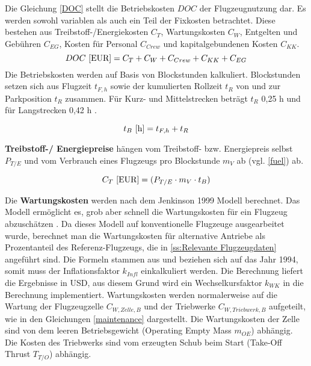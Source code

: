 Die Gleichung \eqref{DOC} stellt die Betriebskosten $DOC$ der Flugzeugnutzung dar. 
Es werden sowohl variablen als auch ein Teil der Fixkosten betrachtet.
Diese bestehen aus Treibstoff-/Energiekosten $C_T$, 
Wartungskosten $C_W$, Entgelten und Gebühren $C_{EG}$, 
Kosten für Personal $C_{Crew}$ und kapitalgebundenen Kosten $C_{KK}$.
%
\begin{equation}
     {DOC ~[\text{EUR}]} = C_T + C_W + C_{Crew} + C_{KK} + C_{EG} \\
     \label{DOC}
  \end{equation}
%
Die Betriebskosten werden auf Basis von Blockstunden kalkuliert. 
Blockstunden setzen sich aus Flugzeit $t_{F,h}$ sowie der kumulierten Rollzeit $t_{R}$ 
von und zur Parkposition $t_{R}$ zusammen. 
Für Kurz- und Mittelstrecken beträgt $t_{R}$ {0,25 h} und für Langstrecken 0,42 h \cite{scholz_design_evaluation_doc}.

\begin{equation}
   t_{B} ~[\text{h}] = t_{F,h} + t_{R} \\
   \label{blockzeit}
\end{equation}

\textbf{Treibstoff-/ Energiepreise} hängen vom Treibstoff- bzw. Energiepreis selbst $P_{T/E}$ 
und vom Verbrauch eines Flugzeugs pro Blockstunde $m_{V}$ ab (vgl. \eqref{fuel}) ab.

\begin{equation}
   {C_T ~[\text{EUR}]} = (P_{T/E} \cdot m_{V} \cdot t_B) \\
   \label{fuel}
\end{equation}
%

Die \textbf{Wartungskosten} werden nach dem Jenkinson 1999 Modell berechnet. 
Das Modell ermöglicht es, grob aber schnell die Wartungskosten 
für ein Flugzeug abzuschätzen \cite{bruge2018wartungskosten}.
Da dieses Modell auf konventionelle Flugzeuge ausgearbeitet wurde, 
berechnet man die Wartungskosten für alternative Antriebe als Prozentanteil des Referenz-Flugzeugs, 
die in \ref{ss:Relevante Flugzeugdaten} angeführt sind.
Die Formeln stammen aus \cite{bruge2018wartungskosten} und beziehen sich auf das Jahr 1994, 
somit muss der Inflationsfaktor $k_{Infl}$ einkalkuliert werden. 
Die Berechnung liefert die Ergebnisse in USD, 
aus diesem Grund wird ein Wechselkursfaktor $k_{WK}$ in die Berechnung implementiert.
Wartungskosten werden normalerweise auf die Wartung der Flugzeugzelle $C_{W,Zelle,B}$ 
und der Triebwerke $C_{W,Triebwerk,B}$ aufgeteilt, 
wie in den Gleichungen \eqref{maintenance} dargestellt. 
Die Wartungskosten der Zelle sind von dem leeren Betriebsgewicht 
(Operating Empty Mass $m_{OE}$) abhängig. 
Die Kosten des Triebwerks sind vom erzeugten Schub beim Start (Take-Off Thrust $T_{T/O}$) abhängig.

